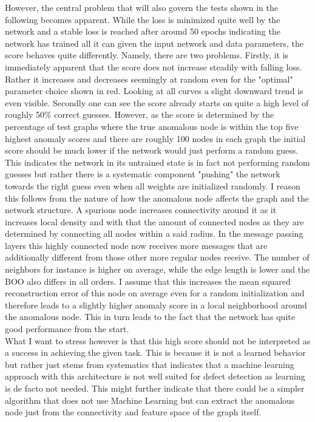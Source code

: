 \documentclass[11pt,a4paper]{article}
\begin{document}
However, the central problem that will also govern the tests shown in the following becomes apparent. 
While the loss is minimized quite well by the network and a stable loss is reached after around 50 epochs indicating the network has trained all it can given the input network and data parameters, the score behaves quite differently. 
Namely, there are two problems. 
Firstly, it is immediately apparent that the score does not increase steadily with falling loss. 
Rather it increases and decreases seemingly at random even for the "optimal" parameter choice shown in red. 
Looking at all curves a slight downward trend is even visible. 
Secondly one can see the score already starts on quite a high level of roughly 50\% correct guesses. 
However, as the score is determined by the percentage of test graphs where the true anomalous node is within the top five highest anomaly scores and there are roughly 100 nodes in each graph the initial score should be much lower if the network would just perform a random guess. 
This indicates the network in its untrained state is in fact not performing random guesses but rather there is a systematic component "pushing" the network towards the right guess even when all weights are initialized randomly. 
I reason this follows from the nature of how the anomalous node affects the graph and the network structure. 
A spurious node increases connectivity around it as it increases local density and with that the amount of connected nodes as they are determined by connecting all nodes within a said radius. 
In the message passing layers this highly connected node now receives more messages that are additionally different from those other more regular nodes receive. 
The number of neighbors for instance is higher on average, while the edge length is lower and the BOO also differs in all orders. 
I assume that this increases the mean squared reconstruction error of this node on average even for a random initialization and therefore leads to a slightly higher anomaly score in a local neighborhood around the anomalous node. 
This in turn leads to the fact that the network has quite good performance from the start. \\
What I want to stress however is that this high score should not be interpreted as a success in achieving the given task. 
This is because it is not a learned behavior but rather just stems from systematics that indicates that a machine learning approach with this architecture is not well suited for defect detection as learning is de facto not needed. 
This might further indicate that there could be a simpler algorithm that does not use Machine Learning but can extract the anomalous node just from the connectivity and feature space of the graph itself. \\
\end{document}
